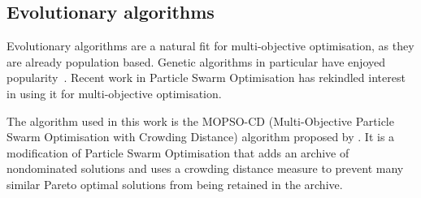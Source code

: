 
\subsection{Evolutionary algorithms}
Evolutionary algorithms are a natural fit for multi-objective
optimisation, as they are already population based.  Genetic
algorithms in particular have enjoyed
popularity~\cite{Deb2001MultiObjective}.  Recent work in Particle
Swarm Optimisation has rekindled interest in using it for
multi-objective optimisation.

The algorithm used in this work is the MOPSO-CD (Multi-Objective
Particle Swarm Optimisation with Crowding Distance) algorithm proposed
by \cite{Raquel2005Effective}.  It is a modification of Particle Swarm
Optimisation that adds an archive of nondominated solutions and uses a
crowding distance measure to prevent many similar Pareto optimal
solutions from being retained in the archive.



